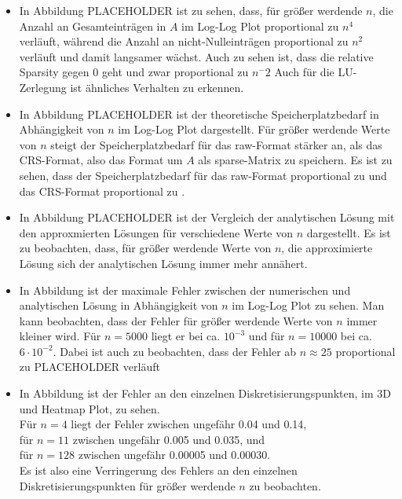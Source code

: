 \documentclass{scrartcl}
\theoremstyle{remark}
\begin{document}
\begin{itemize}
  \item In Abbildung PLACEHOLDER %
        ist zu sehen, dass, für größer werdende \(n\), die Anzahl an Gesamteinträgen in \(A\) im Log-Log Plot proportional zu \(n^4\) verläuft,
        während die Anzahl an nicht-Nulleinträgen proportional zu \(n^2\) verläuft und damit langsamer wächst.
        Auch zu sehen ist, dass die relative Sparsity gegen 0 geht und zwar proportional zu \(n^-2\)
        Auch für die LU-Zerlegung ist ähnliches Verhalten zu erkennen.


  \item In Abbildung PLACEHOLDER %
        ist der theoretische Speicherplatzbedarf in Abhängigkeit von \(n\) im Log-Log Plot
        dargestellt. Für größer werdende Werte von \(n\) steigt der Speicherplatzbedarf für das raw-Format
        stärker an, als das CRS-Format, also das Format um \(A\) als sparse-Matrix zu speichern. Es ist zu sehen, dass der Speicherplatzbedarf
        für das raw-Format proportional zu %
        und das CRS-Format proportional zu %
        .

  \item In Abbildung PLACEHOLDER %
        ist der Vergleich der analytischen Lösung mit den approxmierten Lösungen für verschiedene Werte von \(n\) dargestellt.
        Es ist zu beobachten, dass, für größer werdende Werte von \(n\), die approximierte Lösung sich der analytischen Lösung immer mehr annähert.

  \item In Abbildung %
        ist der maximale Fehler zwischen der numerischen und analytischen Lösung in Abhängigkeit von \(n\) im Log-Log Plot zu sehen.
        Man kann beobachten, dass der Fehler für größer werdende Werte von \(n\) immer kleiner wird.
        Für \(n = 5000\) liegt er bei ca. \(10^{-3}\) und
        für \(n = 10000\) bei ca. \(6 \cdot 10^{-2}\).
        Dabei ist auch zu beobachten, dass der Fehler ab \(n \approx 25\) proportional zu PLACEHOLDER
        verläuft


  \item In Abbildung %
        ist der Fehler an den einzelnen Diskretisierungspunkten, im 3D und Heatmap Plot, zu sehen. \\
        Für \(n = 4\) liegt der Fehler zwischen ungefähr 0.04 und 0.14, \\
        für \(n = 11\) zwischen ungefähr 0.005 und 0.035, und \\
        für \(n = 128\) zwischen ungefähr 0.00005 und 0.00030. \\
        Es ist also eine Verringerung des Fehlers an den einzelnen Diskretisierungspunkten für größer werdende \(n\) zu beobachten.
\end{itemize}
\end{document}
